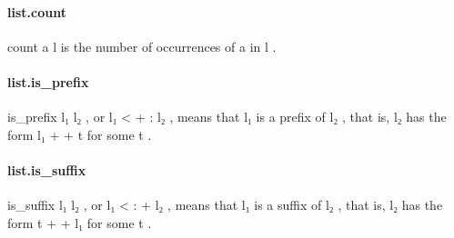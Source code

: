 \documentclass{article}
\begin{document}
\paragraph{list.count}
\par
\colorbox[RGB]{253,246,227}{{{{\color[RGB]{101, 123, 131} count a l }}}} is the number of occurrences of 
\colorbox[RGB]{253,246,227}{{{{\color[RGB]{101, 123, 131} a }}}} in 
\colorbox[RGB]{253,246,227}{{{{\color[RGB]{101, 123, 131} l }}}}.
\paragraph{list.is\_prefix}
\par
\colorbox[RGB]{253,246,227}{{{{\color[RGB]{101, 123, 131} is\_prefix l₁ l₂ }}}}, or 
\colorbox[RGB]{253,246,227}{{{{\color[RGB]{101, 123, 131} l₁  }}}{{{\color[RGB]{181, 137, 0} < }}}{{{\color[RGB]{181, 137, 0} + }}}{{{\color[RGB]{101, 123, 131} : l₂ }}}}, means that 
\colorbox[RGB]{253,246,227}{{{{\color[RGB]{101, 123, 131} l₁ }}}} is a prefix of 
\colorbox[RGB]{253,246,227}{{{{\color[RGB]{101, 123, 131} l₂ }}}},
that is, 
\colorbox[RGB]{253,246,227}{{{{\color[RGB]{101, 123, 131} l₂ }}}} has the form 
\colorbox[RGB]{253,246,227}{{{{\color[RGB]{101, 123, 131} l₁  }}}{{{\color[RGB]{181, 137, 0} + }}}{{{\color[RGB]{181, 137, 0} + }}}{{{\color[RGB]{101, 123, 131}  t }}}} for some 
\colorbox[RGB]{253,246,227}{{{{\color[RGB]{101, 123, 131} t }}}}.
\paragraph{list.is\_suffix}
\par
\colorbox[RGB]{253,246,227}{{{{\color[RGB]{101, 123, 131} is\_suffix l₁ l₂ }}}}, or 
\colorbox[RGB]{253,246,227}{{{{\color[RGB]{101, 123, 131} l₁  }}}{{{\color[RGB]{181, 137, 0} < }}}{{{\color[RGB]{101, 123, 131} : }}}{{{\color[RGB]{181, 137, 0} + }}}{{{\color[RGB]{101, 123, 131}  l₂ }}}}, means that 
\colorbox[RGB]{253,246,227}{{{{\color[RGB]{101, 123, 131} l₁ }}}} is a suffix of 
\colorbox[RGB]{253,246,227}{{{{\color[RGB]{101, 123, 131} l₂ }}}},
that is, 
\colorbox[RGB]{253,246,227}{{{{\color[RGB]{101, 123, 131} l₂ }}}} has the form 
\colorbox[RGB]{253,246,227}{{{{\color[RGB]{101, 123, 131} t  }}}{{{\color[RGB]{181, 137, 0} + }}}{{{\color[RGB]{181, 137, 0} + }}}{{{\color[RGB]{101, 123, 131}  l₁ }}}} for some 
\colorbox[RGB]{253,246,227}{{{{\color[RGB]{101, 123, 131} t }}}}.
\end{document}
